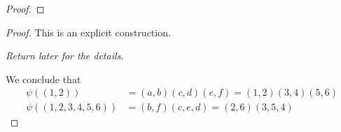 \documentclass[../notes.tex]{subfiles}
\begin{document}
\begin{itemize}
\begin{proof}
    \end{proof}
    \begin{proof}
        This is an explicit construction.\par\smallskip
        \emph{Return later for the details.}\par
        We conclude that
        \begin{align*}
            \psi((1,2)) &= (a,b)(c,d)(e,f) = (1,2)(3,4)(5,6)\\
            \psi((1,2,3,4,5,6)) &= (b,f)(c,e,d) = (2,6)(3,5,4)
        \end{align*}
    \end{proof}
\end{itemize}
\end{document}
